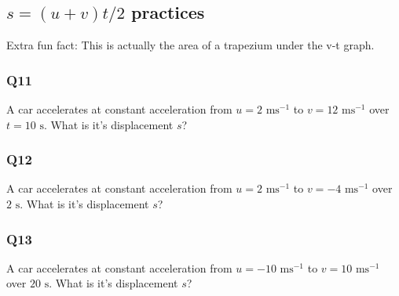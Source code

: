 \documentclass{article}
\begin{document}
\subsection{$s = (u+v)t/2$ practices}
Extra fun fact: This is actually the area of a trapezium under the v-t graph. 
\subsubsection{Q11}
A car accelerates at constant acceleration from $u=2\text{ ms}^{-1}$ to $v=12\text{ ms}^{-1}$ over $t=10\text{ s}$. What is it's displacement $s$?\\[50pt]

\subsubsection{Q12}
A car accelerates at constant acceleration from $u=2\text{ ms}^{-1}$ to $v=-4\text{ ms}^{-1}$ over $2\text{ s}$. What is it's displacement $s$?\\[50pt]

\subsubsection{Q13}
A car accelerates at constant acceleration from $u=-10\text{ ms}^{-1}$ to $v=10\text{ ms}^{-1}$ over $20\text{ s}$. What is it's displacement $s$?\\[50pt]
\end{document}
